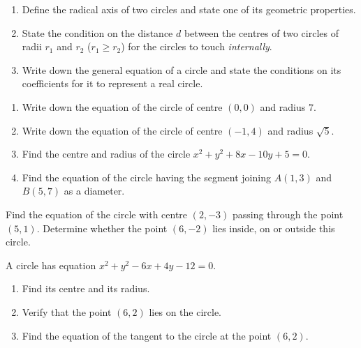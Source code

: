 \documentclass[11pt]{article}
\newcommand{\cle}[1]{{\popxbold\color{popdark}#1}}
\newcounter{popsec}
\newcounter{popsub}
\newcommand{\courssub}[1]{%
  \stepcounter{popsub}%
  \par\vspace{9pt}\noindent{\popxbold\fontsize{11.5}{13}\selectfont\color{popink}{\color{poporange}\thepopsec.\thepopsub}\hspace{6pt}#1}\par\nopagebreak\vspace{4pt}
}
\begin{document}
\begin{exercice}[Definitions]
\begin{enumerate}
\item Define the \cle{radical axis} of two circles and state one of its geometric properties.
\item State the condition on the distance $d$ between the centres of two circles of radii $r_1$ and $r_2$ ($r_1 \geq r_2$) for the circles to touch \emph{internally}.
\item Write down the general equation of a circle and state the conditions on its coefficients for it to represent a real circle.
\end{enumerate}
\end{exercice}

\begin{exercice}
\begin{enumerate}
\item Write down the equation of the circle of centre $(0, 0)$ and radius $7$.
\item Write down the equation of the circle of centre $(-1, 4)$ and radius $\sqrt{5}$.
\item Find the centre and radius of the circle $x^2 + y^2 + 8x - 10y + 5 = 0$.
\item Find the equation of the circle having the segment joining $A(1, 3)$ and $B(5, 7)$ as a diameter.
\end{enumerate}
\end{exercice}

\courssub{I practise}

\begin{exercice}
Find the equation of the circle with centre $(2, -3)$ passing through the point $(5, 1)$. Determine whether the point $(6, -2)$ lies inside, on or outside this circle.
\end{exercice}

\begin{exercice}
A circle has equation $x^2 + y^2 - 6x + 4y - 12 = 0$.
\begin{enumerate}
\item Find its centre and its radius.
\item Verify that the point $(6, 2)$ lies on the circle.
\item Find the equation of the tangent to the circle at the point $(6, 2)$.
\end{enumerate}
\end{exercice}
\end{document}
